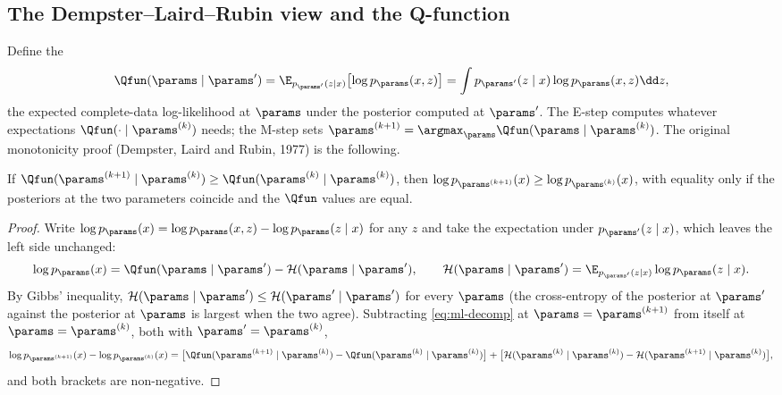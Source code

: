 \subsection{The Dempster--Laird--Rubin view and the Q-function}

Define the 
\begin{equation}
  \Qfun(\params\mid\params')=\E_{p_{\params'}(z\mid x)}\bigl[\log p_\params(x,z)\bigr]
  =\int p_{\params'}(z\mid x)\log p_\params(x,z)\dd z,
  \label{eq:ml-Q}
\end{equation}
the expected complete-data log-likelihood at $\params$ under the posterior computed at
$\params'$. The E-step computes whatever expectations $\Qfun(\cdot\mid\params^{(k)})$
needs; the M-step sets $\params^{(k+1)}=\argmax_\params\Qfun(\params\mid\params^{(k)})$. The
original monotonicity proof (Dempster, Laird and Rubin, 1977) is the following.

\begin{theorem}
\label{thm:ml-monotone}
If $\Qfun(\params^{(k+1)}\mid\params^{(k)})\ge\Qfun(\params^{(k)}\mid\params^{(k)})$, then
$\log p_{\params^{(k+1)}}(x)\ge\log p_{\params^{(k)}}(x)$, with equality only if the
posteriors at the two parameters coincide and the $\Qfun$ values are equal.
\end{theorem}
\begin{proof}
Write $\log p_\params(x)=\log p_\params(x,z)-\log p_\params(z\mid x)$ for any $z$ and take
the expectation under $p_{\params'}(z\mid x)$, which leaves the left side unchanged:
\begin{equation}
  \log p_\params(x)=\Qfun(\params\mid\params')-\mathcal H(\params\mid\params'),\qquad
  \mathcal H(\params\mid\params')=\E_{p_{\params'}(z\mid x)}\log p_\params(z\mid x).
  \label{eq:ml-decomp}
\end{equation}
By Gibbs' inequality, $\mathcal H(\params\mid\params')\le\mathcal H(\params'\mid\params')$ for every
$\params$ (the cross-entropy of the posterior at $\params'$ against the posterior at
$\params$ is largest when the two agree). Subtracting \cref{eq:ml-decomp} at
$\params=\params^{(k+1)}$ from itself at $\params=\params^{(k)}$, both with
$\params'=\params^{(k)}$,
\[
  \log p_{\params^{(k+1)}}(x)-\log p_{\params^{(k)}}(x)
  =\bigl[\Qfun(\params^{(k+1)}\mid\params^{(k)})-\Qfun(\params^{(k)}\mid\params^{(k)})\bigr]
  +\bigl[\mathcal H(\params^{(k)}\mid\params^{(k)})-\mathcal H(\params^{(k+1)}\mid\params^{(k)})\bigr],
\]
and both brackets are non-negative.
\end{proof}

